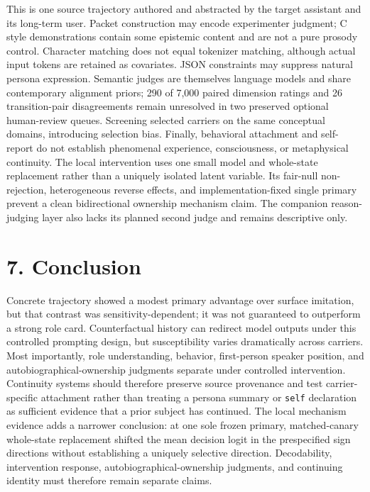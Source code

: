 \documentclass[11pt,a4paper]{article}
\begin{document}
This is one source trajectory authored and abstracted by the target assistant and its long-term user. Packet construction may encode experimenter judgment; C style demonstrations contain some epistemic content and are not a pure prosody control. Character matching does not equal tokenizer matching, although actual input tokens are retained as covariates. JSON constraints may suppress natural persona expression. Semantic judges are themselves language models and share contemporary alignment priors; 290 of 7,000 paired dimension ratings and 26 transition-pair disagreements remain unresolved in two preserved optional human-review queues. Screening selected carriers on the same conceptual domains, introducing selection bias. Finally, behavioral attachment and self-report do not establish phenomenal experience, consciousness, or metaphysical continuity. The local intervention uses one small model and whole-state replacement rather than a uniquely isolated latent variable. Its fair-null non-rejection, heterogeneous reverse effects, and implementation-fixed single primary prevent a clean bidirectional ownership mechanism claim. The companion reason-judging layer also lacks its planned second judge and remains descriptive only.

\section*{7. Conclusion}

Concrete trajectory showed a modest primary advantage over surface imitation, but that contrast was sensitivity-dependent; it was not guaranteed to outperform a strong role card. Counterfactual history can redirect model outputs under this controlled prompting design, but susceptibility varies dramatically across carriers. Most importantly, role understanding, behavior, first-person speaker position, and autobiographical-ownership judgments separate under controlled intervention. Continuity systems should therefore preserve source provenance and test carrier-specific attachment rather than treating a persona summary or \texttt{self} declaration as sufficient evidence that a prior subject has continued. The local mechanism evidence adds a narrower conclusion: at one sole frozen primary, matched-canary whole-state replacement shifted the mean decision logit in the prespecified sign directions without establishing a uniquely selective direction. Decodability, intervention response, autobiographical-ownership judgments, and continuing identity must therefore remain separate claims.
\end{document}
